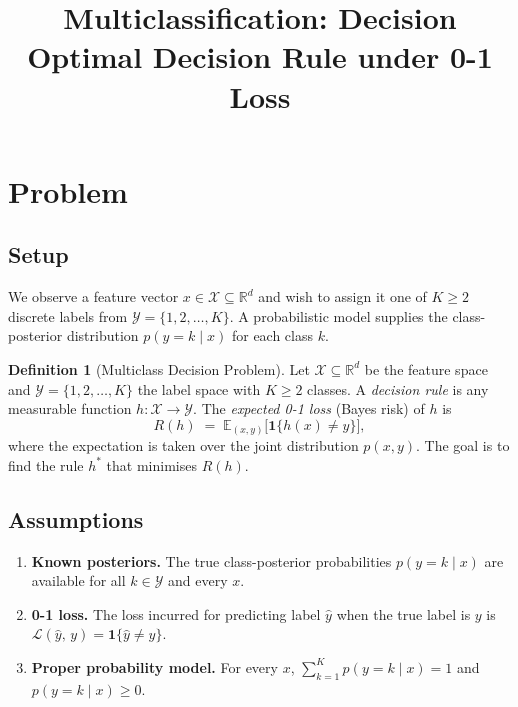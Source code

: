 \documentclass[11pt]{article}
\theoremstyle{definition}
\newtheorem{definition}[theorem]{Definition}
\theoremstyle{remark}
\newcommand{\R}{\mathbb{R}}
\newcommand{\E}{\mathbb{E}}
\begin{document}
\title{\textbf{Multiclassification: Decision}\\[0.4em]
       \large Optimal Decision Rule under 0-1 Loss}
\author{}
\date{}
\maketitle
\tableofcontents
\newpage

\section{Problem}

\subsection{Setup}

We observe a feature vector $x \in \mathcal{X} \subseteq \R^{d}$ and wish to
assign it one of $K \geq 2$ discrete labels from
$\mathcal{Y} = \{1, 2, \ldots, K\}$.
A probabilistic model supplies the class-posterior distribution
$p(y = k \mid x)$ for each class $k$.

\begin{definition}[Multiclass Decision Problem]
    Let $\mathcal{X} \subseteq \R^{d}$ be the feature space and
    $\mathcal{Y} = \{1, 2, \ldots, K\}$ the label space with $K \geq 2$ classes.
    A \emph{decision rule} is any measurable function $h : \mathcal{X} \to \mathcal{Y}$.
    The \emph{expected 0-1 loss} (Bayes risk) of $h$ is
    \[
        R(h) \;=\; \E_{(x,y)}\!\bigl[\mathbf{1}\{h(x) \neq y\}\bigr],
    \]
    where the expectation is taken over the joint distribution $p(x, y)$.
    The goal is to find the rule $h^{*}$ that minimises $R(h)$.
\end{definition}

\subsection{Assumptions}

\begin{enumerate}[label=\textbf{A\arabic*.}]
    \item \textbf{Known posteriors.} The true class-posterior probabilities
          $p(y = k \mid x)$ are available for all $k \in \mathcal{Y}$ and every $x$.
    \item \textbf{0-1 loss.} The loss incurred for predicting label $\hat{y}$ when the
          true label is $y$ is
          $\mathcal{L}(\hat{y},\, y) = \mathbf{1}\{\hat{y} \neq y\}$.
    \item \textbf{Proper probability model.} For every $x$,
          $\sum_{k=1}^{K} p(y = k \mid x) = 1$ and $p(y = k \mid x) \geq 0$.
\end{enumerate}
\end{document}
